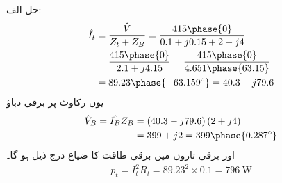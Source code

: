حل الف:
\begin{align*}
\hat{I_t}&=\frac{\hat{V}}{Z_t+Z_B}=\frac{415\phase{0}}{0.1+j 0.15+2+j 4}\\
&=\frac{415\phase{0}}{2.1+j 4.15}=\frac{415\phase{0}}{4.651\phase{63.15}}\\
&=89.23\phase{-63.159^{\circ}}=40.3-j79.6
\end{align*}
یوں رکاوٹ پر برقی دباؤ
\begin{align*}
\hat{V}_B=\hat{I_B} Z_B&=\left(40.3-j79.6 \right) \left( 2+j 4\right)\\
&=399+j2=399\phase{0.287^{\circ}}
\end{align*}
اور برقی تاروں میں برقی طاقت کا ضیاع درج ذیل ہو گا۔
\begin{align*}
p_t=I_t^2 R_t=89.23^2 \times 0.1=\SI{796}{\watt}
\end{align*}

